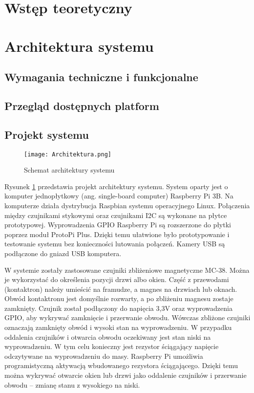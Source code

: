 \documentclass[a4paper,12pt,twoside]{article}
\begin{document}
\tableofcontents
\setcounter{tocdepth}{2}
\newpage

\section{Wstęp teoretyczny}

\section{Architektura systemu}

\subsection{Wymagania techniczne i funkcjonalne}

\subsection{Przegląd dostępnych platform}

\subsection{Projekt systemu}
\begin{figure}[h]
\texttt{[image: Architektura.png]}
\caption{Schemat architektury systemu}
\label{fig: architektura}
\end{figure}

Rysunek \ref{fig: architektura} przedstawia projekt architektury systemu. System oparty jest o komputer jednopłytkowy (ang. single-board computer) Raspberry Pi 3B. Na komputerze działa dystrybucja Raspbian systemu operacyjnego Linux. Połączenia między czujnikami stykowymi oraz czujnikami I2C są wykonane na płytce prototypowej. Wyprowadzenia GPIO Raspberry Pi są rozszerzone do płytki poprzez moduł ProtoPi Plus. Dzięki temu ułatwione było prototypowanie i testowanie systemu bez konieczności lutowania połączeń. Kamery USB są podłączone do gniazd USB komputera.

W systemie zostały zastosowane czujniki zbliżeniowe magnetyczne MC-38. Można je wykorzystać do określenia pozycji drzwi albo okien. Część z przewodami (kontaktron) należy umieścić na framudze, a magnes na drzwiach lub oknach. Obwód kontaktronu jest domyślnie rozwarty, a po zbliżeniu magnesu zostaje zamknięty. Czujnik został podłączony do napięcia 3,3V oraz wyprowadzenia GPIO, aby wykrywać zamknięcie i przerwanie obwodu. Wówczas zbliżone czujniki oznaczają zamknięty obwód i wysoki stan na wyprowadzeniu. W przypadku oddalenia czujników i otwarcia obwodu oczekiwany jest stan niski na wyprowadzeniu. W tym celu konieczny jest rezystor ściągający napięcie odczytywane na wyprowadzeniu do masy. Raspberry Pi umożliwia programistyczną aktywacją wbudowanego rezystora ściągającego. Dzięki temu można wykrywać otwarcie okien lub drzwi jako oddalenie czujników i przerwanie obwodu -- zmianę stanu z wysokiego na niski.
\end{document}
